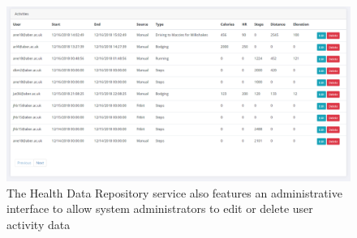 \begin{figure}[H]
    \centering
    \includegraphics[width=\textwidth]{Images/service_health_data_repository.png}
    \caption{The Health Data Repository service also features an administrative interface to allow system administrators to edit or delete user activity data}
\end{figure}